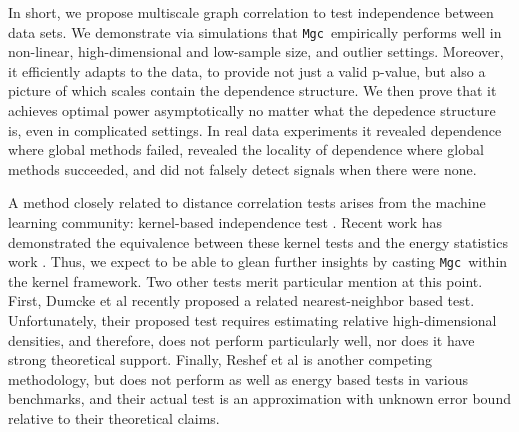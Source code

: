 \documentclass[11pt]{article}
\providecommand{\sct}[1]{{\sc \texttt{#1}}}
\newcommand{\Mgc}{\sct{Mgc}}
\begin{document}
In short, we propose multiscale graph correlation to test independence between data sets. 
We demonstrate via simulations that \Mgc~empirically performs well in non-linear, high-dimensional and low-sample size, and outlier settings.  Moreover, it efficiently adapts to the data, to provide not just a valid p-value, but also a picture of which scales contain the dependence structure. We then prove that it achieves optimal power asymptotically no matter what the depedence structure is, even in complicated settings.  In real data experiments it revealed dependence where global methods failed, revealed the locality of dependence where global methods succeeded, and did not falsely detect signals when there were none.




A method closely related to distance correlation tests arises from the machine learning community: kernel-based independence test  \cite{GrettonEtAl2005, GrettonGyorfi2010, GrettonEtAl2012}.  Recent work has demonstrated the equivalence between these kernel tests and the energy statistics work \cite{SejdinovicEtAl2013, RamdasEtAl2015}. Thus, we expect to be able to glean further insights by casting \Mgc~within the kernel framework.  Two other tests merit particular mention at this point.  First, Dumcke et al \cite{Dumcke2014} recently proposed a related nearest-neighbor based test.  Unfortunately, their proposed test requires estimating relative high-dimensional densities, and therefore, does not perform particularly well, nor does it have strong theoretical support. 
Finally, Reshef et al \cite{Reshef2011} is another competing methodology, but does not perform as well as energy based tests in various benchmarks, and their actual test is an approximation with unknown error bound relative to their theoretical claims.  
\end{document}
